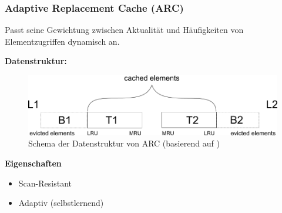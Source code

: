 \documentclass[presentation]{beamer}
\begin{document}
\begin{frame}
\frametitle{Adaptive Replacement Cache (ARC)}
Passt seine Gewichtung zwischen Aktualität und Häufigkeiten von Elementzugriffen dynamisch an.\\
\vspace{0.3cm}

\color{dd-gray} \textbf{Datenstruktur:} \color{black} 
\begin{figure}
	\includegraphics[width=0.9\linewidth]{figures/caches/arc} 
	\caption{Schema der Datenstruktur von ARC (basierend auf \cite{megiddo2003arc})}
\end{figure} 
\textbf{Eigenschaften}
\begin{itemize}
	\item Scan-Resistant %
	\item Adaptiv (selbstlernend) %
\end{itemize}
\end{frame}
\end{document}
